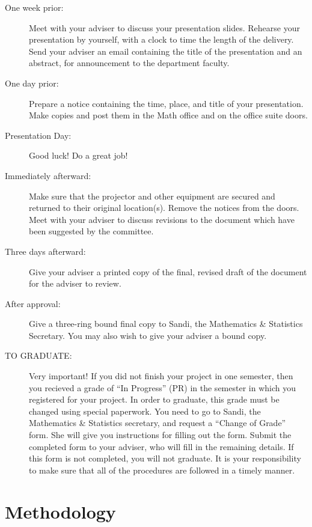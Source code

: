 \documentclass[11pt]{article}
\begin{document}
\begin{description}
\item[One week prior:] Meet with your adviser to discuss your
presentation slides. Rehearse your presentation by yourself, with
a clock to time the length of the delivery. Send your adviser an
email containing the title of the presentation and an abstract,
for announcement to the department faculty.

\item[One day prior:] Prepare a notice containing the time, place, and
title of your presentation. Make copies and post
them in the Math office and on the office suite
doors.

\item[Presentation Day:] Good luck! Do a great job!

\item[Immediately afterward:] Make sure that the projector and other
equipment are secured and returned to their original
location(s). Remove the notices from the doors. Meet with your
adviser to discuss revisions to the document which have been
suggested by the committee.

\item[Three days afterward:] Give your adviser a printed copy of the
final, revised draft of the document for the adviser to review.

\item[After approval:] Give a three-ring bound final copy to Sandi, the
Mathematics \& Statistics Secretary. You may also wish to give
your adviser a bound copy.

\item[TO GRADUATE:] Very important! If you did not finish your project
in one semester, then you recieved a grade of ``In
Progress'' (PR) in the semester in which you
registered for your project.  In order to graduate,
this grade must be changed using special
paperwork. You need to go to Sandi, the Mathematics
\& Statistics secretary, and request a “Change of
Grade” form. She will give you instructions for
filling out the form. Submit the completed form to
your adviser, who will fill in the remaining
details. If this form is not completed, you will not
graduate.  It is your responsibility to make sure
that all of the procedures are followed in a timely
manner.
\end{description}

\newpage

\section[Methodology]{Methodology}
\label{sec-3}
\end{document}

